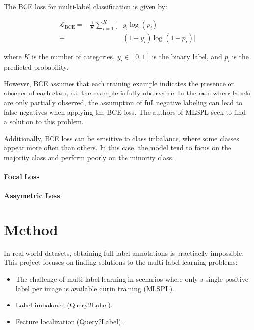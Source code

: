 \documentclass[lettersize,journal]{IEEEtran}
\begin{document}
The BCE loss for multi-label classification is given by:

\begin{equation}
\begin{aligned}
\mathcal{L}_{\text{BCE}} = -\frac{1}{K} \sum_{i=1}^{K} \bigl[ &y_i\log(p_i) \\
+ &(1-y_i)\log(1 - p_i) \bigr]
\end{aligned}
\end{equation}

\noindent where $K$ is the number of categories, $y_i\in[0,1]$ is the binary label, and $p_i$ is the predicted probability.

However, BCE assumes that each training example indicates the presence or absence of each class, e.i. the example is fully observable. In the case where labels are only partially observed, the assumption of full negative labeling can lead to false negatives when applying the BCE loss. The authors of MLSPL seek to find a solution to this problem. 

Additionally, BCE loss can be sensitive to class imbalance, where some classes appear more often than others. In this case, the model tend to focus on the majority class and perform poorly on the minority class. 

\paragraph{Focal Loss}

\paragraph{Assymetric Loss}






\section{Method}

In real-world datasets, obtaining full label annotations is practiaclly impossible.
This project focuses on finding solutions to the multi-label learning problems:
\begin{itemize} 
    \item  The challenge of multi-label learning in scenarios where only a single positive label per image is available durin training (MLSPL).
    \item Label imbalance (Query2Label).
    \item Feature localization (Query2Label).
\end{itemize}
\end{document}
